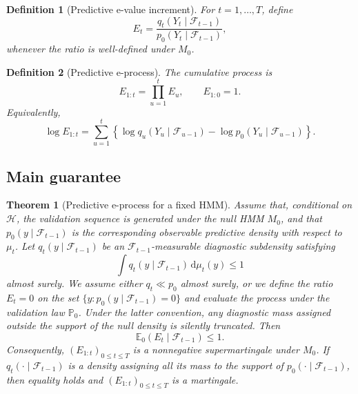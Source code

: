 \documentclass[pdflatex,sn-basic]{sn-jnl}
\theoremstyle{thmstyleone}
\newtheorem{theorem}{Theorem}
\theoremstyle{thmstyletwo}
\theoremstyle{thmstylethree}
\newtheorem{definition}{Definition}
\newcommand{\E}{\mathbb E}
\newcommand{\Pbb}{\mathbb P}
\newcommand{\1}{\mathbf 1}
\newcommand{\calF}{\mathcal F}
\newcommand{\calH}{\mathcal H}
\newcommand{\dd}{\,\mathrm d}
\begin{document}
\begin{definition}[Predictive e-value increment]
For $t=1,\ldots,T$, define
\begin{equation}
\label{eq:increment}
 E_t=\frac{q_t(Y_t\mid\calF_{t-1})}{p_0(Y_t\mid\calF_{t-1})},
\end{equation}
whenever the ratio is well-defined under $M_0$.
\end{definition}

\begin{definition}[Predictive e-process]
The cumulative process is
\begin{equation}
\label{eq:eprocess}
 E_{1:t}=\prod_{u=1}^t E_u,
 \qquad E_{1:0}=1.
\end{equation}
Equivalently,
\begin{equation}
\label{eq:log_eprocess}
 \log E_{1:t}=\sum_{u=1}^t\left\{\log q_u(Y_u\mid\calF_{u-1})-\log p_0(Y_u\mid\calF_{u-1})\right\}.
\end{equation}
\end{definition}

\subsection{Main guarantee}

\begin{theorem}[Predictive e-process for a fixed HMM]
\label{thm:predictive_eprocess}
Assume that, conditional on $\calH$, the validation sequence is generated under the null HMM $M_0$, and that $p_0(y\mid\calF_{t-1})$ is the corresponding observable predictive density with respect to $\mu_t$. Let $q_t(y\mid\calF_{t-1})$ be an $\calF_{t-1}$-measurable diagnostic subdensity satisfying
\begin{equation}
 \int q_t(y\mid\calF_{t-1})\dd\mu_t(y)\leq 1
\end{equation}
almost surely. We assume either $q_t \ll p_0$ almost surely, or we define the ratio $E_t = 0$ on the set $\{y : p_0(y \mid \calF_{t-1}) = 0\}$ and evaluate the process under the validation law $\Pbb_0$. Under the latter convention, any diagnostic mass assigned outside the support of the null density is silently truncated. Then
\begin{equation}
 \E_0(E_t\mid\calF_{t-1})\leq 1.
\end{equation}
Consequently, $(E_{1:t})_{0\le t\le T}$ is a nonnegative supermartingale under $M_0$. If $q_t(\cdot\mid\calF_{t-1})$ is a density assigning all its mass to the support of $p_0(\cdot\mid\calF_{t-1})$, then equality holds and $(E_{1:t})_{0\le t\le T}$ is a martingale.
\end{theorem}
\end{document}
